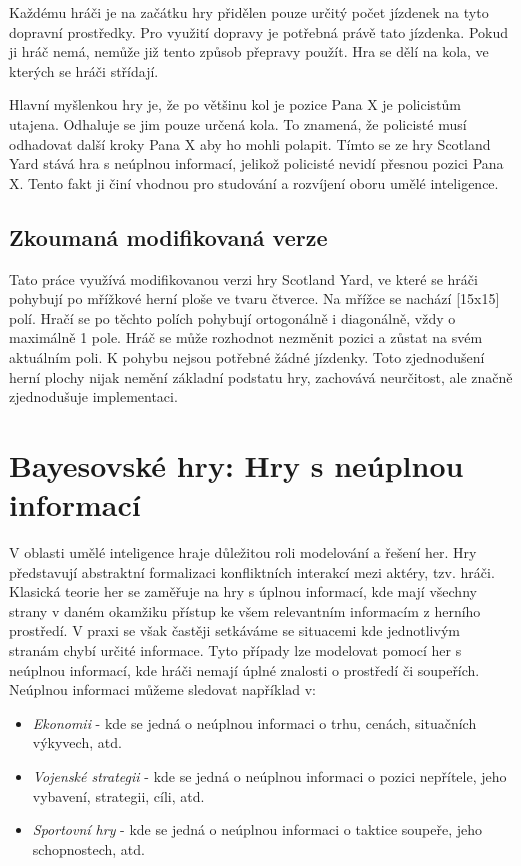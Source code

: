 Každému hráči je na začátku hry přidělen pouze určitý počet jízdenek na tyto dopravní prostředky.
Pro využití dopravy je potřebná právě tato jízdenka.
Pokud ji hráč nemá, nemůže již tento způsob přepravy použít.
Hra se dělí na kola, ve kterých se hráči střídají.


Hlavní myšlenkou hry je, že po většinu kol je pozice Pana X je policistům utajena.
Odhaluje se jim pouze určená kola.
To znamená, že policisté musí odhadovat další kroky Pana X aby ho mohli polapit.
Tímto se ze hry Scotland Yard stává hra s neúplnou informací, jelikož policisté nevidí přesnou pozici Pana X.
Tento fakt ji činí vhodnou pro studování a rozvíjení oboru umělé inteligence.

\subsection*{Zkoumaná modifikovaná verze}

Tato práce využívá modifikovanou verzi hry Scotland Yard, ve které se hráči pohybují po mřížkové herní ploše ve tvaru čtverce.
Na mřížce se nachází {\color{red}[15x15]} polí.
Hračí se po těchto polích pohybují ortogonálně i diagonálně, vždy o maximálně 1 pole.
Hráč se může rozhodnot nezměnit pozici a zůstat na svém aktuálním poli.
K pohybu nejsou potřebné žádné jízdenky.
Toto zjednodušení herní plochy nijak nemění základní podstatu hry, zachovává neurčitost, ale značně zjednodušuje implementaci.

\section{Bayesovské hry: Hry s neúplnou informací}
V oblasti umělé inteligence hraje důležitou roli modelování a řešení her.
Hry představují abstraktní formalizaci konfliktních interakcí mezi aktéry, tzv.
hráči.
Klasická teorie her se zaměřuje na hry s úplnou informací, kde mají všechny strany v daném okamžiku přístup ke všem relevantním informacím z herního prostředí.
V praxi se však častěji setkáváme se situacemi kde jednotlivým stranám chybí určité informace.
Tyto případy lze modelovat pomocí her s neúplnou informací, kde hráči nemají úplné znalosti o prostředí či soupeřích.
Neúplnou informaci můžeme sledovat například v:
\begin{itemize}
  \item \emph{Ekonomii} - kde se jedná o neúplnou informaci o trhu, cenách, situačních výkyvech, atd.
  \item \emph{Vojenské strategii} - kde se jedná o neúplnou informaci o pozici nepřítele, jeho vybavení, strategii, cíli, atd.
  \item \emph{Sportovní hry} - kde se jedná o neúplnou informaci o taktice soupeře, jeho schopnostech, atd.
\end{itemize}

